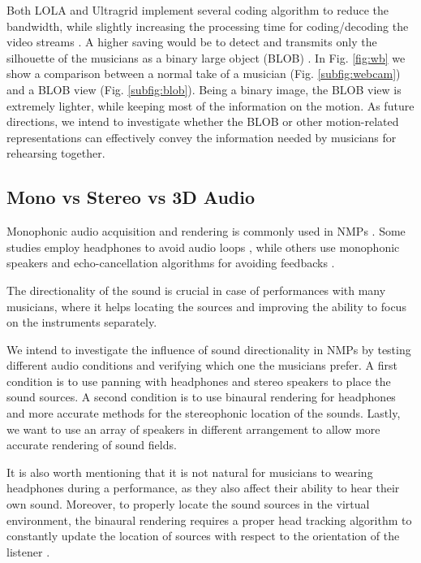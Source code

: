 \documentclass[conference]{IEEEtran}
\begin{document}
Both LOLA and Ultragrid implement several coding algorithm to reduce the bandwidth, while slightly increasing the processing time for coding/decoding the video streams \cite{drioli2013networked,holub2006high}. A higher saving would be to detect and transmits only the silhouette of the musicians as a binary large object (BLOB) \cite{camurri2010visual}. In Fig. \ref{fig:wb} we show a comparison between a normal take of a musician (Fig. \ref{subfig:webcam}) and a BLOB view (Fig. \ref{subfig:blob}).
Being a binary image, the BLOB view is extremely lighter, while keeping most of the information on the motion. As future directions, we intend to investigate whether the BLOB or other motion-related representations can effectively convey the information needed by musicians for rehearsing together. 


\subsection{Mono vs Stereo vs 3D Audio}
Monophonic audio acquisition and rendering is commonly used in NMPs \cite{CIM2018}. Some studies employ headphones to avoid audio loops \cite{RottondiFeature}, while others use monophonic speakers and echo-cancellation algorithms for avoiding feedbacks \cite{drioli2013networked}. 

The directionality of the sound is crucial %
in case of performances with many musicians, where it helps locating the sources and improving the ability to focus on the instruments separately. 

We intend to investigate the influence of sound directionality in NMPs by testing different audio conditions and verifying which one the musicians prefer. A first condition is to use panning with headphones and stereo speakers to place the sound sources. A second condition is to use binaural rendering for headphones and more accurate methods for the stereophonic location of the sounds. Lastly, we want to use an array of speakers in different arrangement to allow more accurate rendering of sound fields. 

It is also worth mentioning that it is not natural for musicians to wearing headphones during a performance, as they also affect their ability to hear their own sound. Moreover, to properly locate the sound sources in the virtual environment, the binaural rendering requires a proper head tracking algorithm to constantly update the location of sources with respect to the orientation of the listener \cite{Bonacina2016}.
\end{document}
